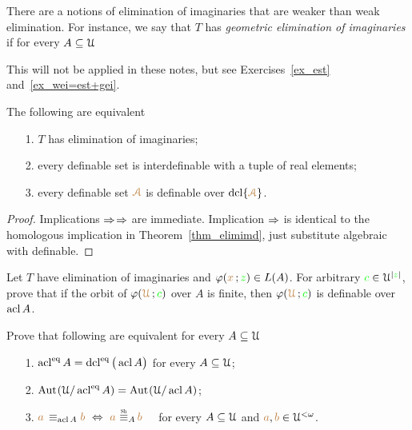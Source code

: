 \documentclass[creche.tex]{subfiles}
\begin{document}
There are a notions of elimination of imaginaries that are weaker than weak elimination.
For instance, we say that $T$ has \emph{geometric elimination of imaginaries\/} if for every $A\subseteq\EuScript U$

\ceq{\hfill {\vl\Aa} }{\in}{{\acl}^\eq\big(\acl\{{\vl\Aa}\}\big)}

This will not  be applied in these notes, but see Exercises~\ref{ex_est} and~\ref{ex_wei=est+gei}.

\begin{theorem}\label{elimimf} 
The following are equivalent
\begin{itemize}
\item[1.] $T$ has elimination of imaginaries;
\item[2.] every definable set is interdefinable with a tuple of real elements;
\item[3.] every definable set ${\color{brown}\EuScript A}$ is definable over $\mathop{\rm dcl}\{{\color{brown}\EuScript A}\}$.
\end{itemize}
\end{theorem}

\begin{proof}
Implications $\Rightarrow$$\Rightarrow$ are immediate.
Implication $\Rightarrow$ is identical to the homologous implication in Theorem~\ref{thm_elimimd}, just substitute algebraic with definable.
\end{proof}



\begin{exercise}
  Let $T$ have elimination of imaginaries and $\varphi({\color{brown} x}\,;{\color{green} z})\in L(A)$.
  For arbitrary ${\color{green} c}\in\EuScript U^{|{\color{green} z}|}$, prove that if the orbit of $\varphi({\color{brown}\EuScript U}\,; {\color{green} c})$ over $A$ is finite, then $\varphi({\color{brown}\EuScript U}\,; {\color{green} c})$ is definable over $\mathop{\rm acl} A$.\QED
  \end{exercise}
  
  
  \begin{exercise}\label{ex_est}
    Prove that following are equivalent for every $A\subseteq\EuScript U$
    \begin{itemize}
    \item[1.]  $\mathop{\rm acl}^{{\rm eq}} A=\mathop{\rm dcl}^{{\rm eq}}\big(\mathop{\rm acl} A\big)$ for every $A\subseteq\EuScript U$;
    \item[2.]  ${\rm Aut\kern.15ex}(\EuScript U/\mathop{\rm acl}^{{\rm eq}} A)= {\rm Aut\kern.15ex}(\EuScript U/\mathop{\rm acl} A)$;
    \item[3.] ${\mr a}\,\equiv_{\acl A}{\mr b}\ \IFF\ {\mr a}\ \smash{\equivSh_A}\, {\mr b}$ \ \ for every $A\subseteq\EuScript U$ and  ${\color{brown} a},{\color{brown} b}\in\EuScript U^{<\omega}$.\QED
    \end{itemize} 
  \end{exercise}
  
\end{document}
